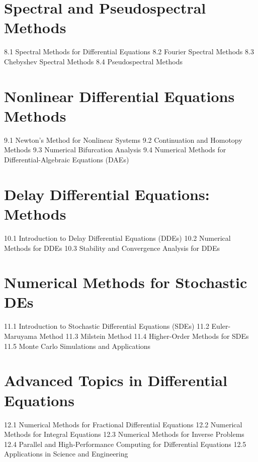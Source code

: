 \section{Spectral and Pseudospectral Methods}
8.1 Spectral Methods for Differential Equations
8.2 Fourier Spectral Methods
8.3 Chebyshev Spectral Methods
8.4 Pseudospectral Methods
\section{Nonlinear Differential Equations Methods}
9.1 Newton's Method for Nonlinear Systems
9.2 Continuation and Homotopy Methods
9.3 Numerical Bifurcation Analysis
9.4 Numerical Methods for Differential-Algebraic Equations (DAEs)
\section{Delay Differential Equations: Methods}
10.1 Introduction to Delay Differential Equations (DDEs)
10.2 Numerical Methods for DDEs
10.3 Stability and Convergence Analysis for DDEs
\section{Numerical Methods for Stochastic DEs}
11.1 Introduction to Stochastic Differential Equations (SDEs)
11.2 Euler-Maruyama Method
11.3 Milstein Method
11.4 Higher-Order Methods for SDEs
11.5 Monte Carlo Simulations and Applications
\section{Advanced Topics in Differential Equations}
12.1 Numerical Methods for Fractional Differential Equations
12.2 Numerical Methods for Integral Equations
12.3 Numerical Methods for Inverse Problems
12.4 Parallel and High-Performance Computing for Differential Equations
12.5 Applications in Science and Engineering
